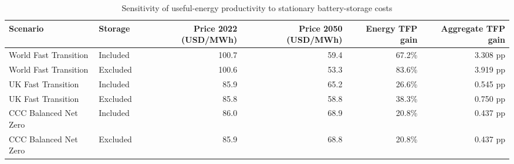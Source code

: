 
\begin{longtable}[t]{llrrrr}
\caption{\label{tab:tab_storage_sensitivity}Sensitivity of useful-energy productivity to stationary battery-storage costs}\\
\toprule
Scenario & Storage & Price 2022 (USD/MWh) & Price 2050 (USD/MWh) & Energy TFP gain & Aggregate TFP gain\\
\midrule
World Fast Transition & Included & 100.7 & 59.4 & 67.2\% & 3.308 pp\\
World Fast Transition & Excluded & 100.6 & 53.3 & 83.6\% & 3.919 pp\\
UK Fast Transition & Included & 85.9 & 65.2 & 26.6\% & 0.545 pp\\
UK Fast Transition & Excluded & 85.8 & 58.8 & 38.3\% & 0.750 pp\\
CCC Balanced Net Zero & Included & 86.0 & 68.9 & 20.8\% & 0.437 pp\\
\addlinespace
CCC Balanced Net Zero & Excluded & 85.9 & 68.8 & 20.8\% & 0.437 pp\\
\bottomrule
\end{longtable}
